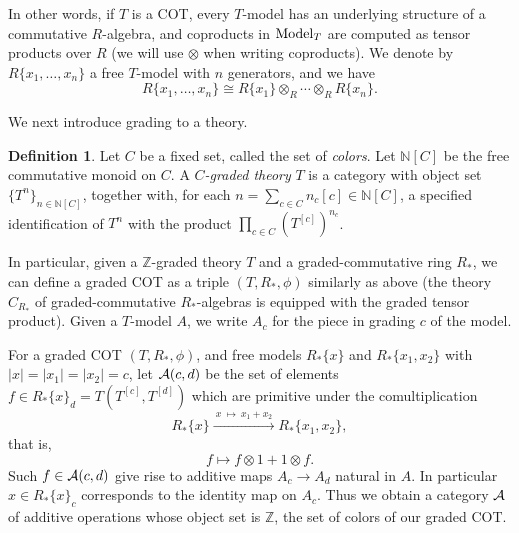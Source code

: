 \documentclass{gtpart}
\theoremstyle{definition}
\newtheorem{defn}[thm]{Definition}
\theoremstyle{remark}
\newcommand{\mb}[1]{\mathbb{#1}}
\newcommand{\CA}{{\cal A}}
\newcommand{\Model}{{\rm Model}}
\newcommand{\BN}{{\mb N}}
\newcommand{\BZ}{{\mb Z}}
\numberwithin{equation}{section}
\numberwithin{thm}{section}
\begin{document}
In other words, if $T$ is a COT, every $T$-model has an underlying 
structure of a commutative $R$-algebra, and coproducts in $\Model_T$ are 
computed as tensor products over $R$ (we will use $\otimes$ when writing 
coproducts).  We denote by $R\{x_1,\ldots,x_n\}$ a free $T$-model with 
$n$ generators, and we have 
\[
 R\{x_1,\ldots,x_n\} \cong R\{x_1\} \otimes_R \cdots \otimes_R R\{x_n\}.  
\]

We next introduce grading to a theory.  

\begin{defn}
 Let $C$ be a fixed set, called the set of {\em colors}.  Let $\BN[C]$ 
 be the free commutative monoid on $C$.  A {\em $C$-graded theory} $T$ 
 is a category with object set $\{T^n\}_{n \in \BN[C]}$, together with, 
 for each $n = \sum_{c \in C} n_c[c] \in \BN[C]$, a specified 
 identification of $T^n$ with the product 
 $\prod_{c \in C} (T^{[c]})^{n_c}$.  
\end{defn}

In particular, given a $\BZ$-graded theory $T$ and a graded-commutative 
ring $R_*$, we can define a graded COT as a triple $(T,R_*,\phi)$ 
similarly as above (the theory $C_{R_*}$ of graded-commutative 
$R_*$-algebras is equipped with the graded tensor product).  Given a 
$T$-model $A$, we write $A_c$ for the piece in grading $c$ of the model.  

For a graded COT $(T,R_*,\phi)$, and free models $R_*\{x\}$ and 
$R_*\{x_1,x_2\}$ with $|x| = |x_1| = |x_2| = c$, let $\CA(c,d)$ be the 
set of elements $f \in R_*\{x\}_d = T(T^{[c]},T^{[d]})$ which are 
primitive under the comultiplication 
\[
 R_*\{x\} \xrightarrow{~ x ~ \mapsto ~ x_1 + x_2 ~} R_*\{x_1,x_2\}, 
\]
that is, 
\begin{equation}
\label{primitive}
 f \longmapsto f \otimes 1 + 1 \otimes f.  
\end{equation}
Such $f \in \CA(c,d)$ give rise to additive maps $A_c \to A_d$ natural 
in $A$.  In particular $x \in R_*\{x\}_c$ corresponds to the identity 
map on $A_c$.  Thus we obtain a category $\CA$ of additive operations 
whose object set is $\BZ$, the set of colors of our graded COT.  
\end{document}
